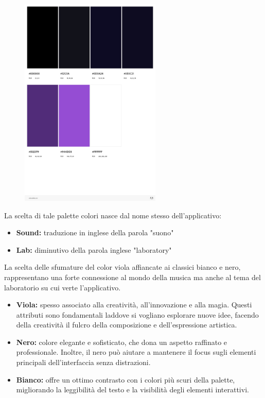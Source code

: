 \documentclass{article}
\begin{document}
		\begin{figure}[H]
			\centering
			\includegraphics[width=0.6\textwidth]{Immagini/palette}
		\end{figure}
		La scelta di tale palette colori nasce dal nome stesso dell'applicativo:
		\begin{itemize}
			\item \textbf{Sound:} traduzione in inglese della parola "suono"
			\item \textbf{Lab:} diminutivo della parola inglese "laboratory"
		\end{itemize}
		La scelta delle sfumature del color viola affiancate ai classici bianco e nero, rappresentano una forte connessione al mondo della musica ma anche al tema del laboratorio su cui verte l'applicativo.
		\begin{itemize}
			\item \textbf{Viola:} spesso associato alla creatività, all'innovazione e alla magia. Questi attributi sono fondamentali laddove si vogliano esplorare nuove idee, facendo della creatività il fulcro della composizione e dell'espressione artistica.
			\item \textbf{Nero:} colore elegante e sofisticato, che dona un aspetto raffinato e professionale. Inoltre, il nero può aiutare a mantenere il focus sugli elementi principali dell'interfaccia senza distrazioni.
			\item \textbf{Bianco:} offre un ottimo contrasto con i colori più scuri della palette, migliorando la leggibilità del testo e la visibilità degli elementi interattivi.
		\end{itemize}
\end{document}
